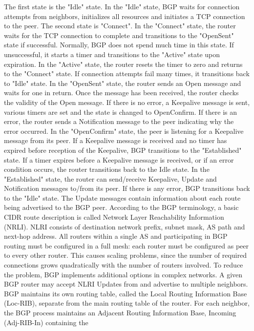 \documentclass[a4paper]{article}
\begin{document}
The first state is the "Idle" state. In the "Idle" state, BGP waits for connection attempts from neighbors, initializes
all resources and initiates a TCP connection to the peer. The second state is "Connect". In the "Connect" state, the
router waits for the TCP connection to complete and transitions to the "OpenSent" state if successful. Normally, BGP
does not spend much time in this state. If unsuccessful, it starts a timer and transitions to the "Active" state upon
expiration. In the "Active" state, the router resets the timer to zero and returns to the "Connect" state. If
connection attempts fail many times, it transitions back to "Idle" state. In the "OpenSent" state, the router sends an
Open message and waits for one in return. Once the message has been received, the router checks the validity of the
Open message. If there is no error, a Keepalive message is sent, various timers are set and the state is changed to
OpenConfirm. If there is an error, the router sends a Notification message to the peer indicating why the error
occurred. In the "OpenConfirm" state, the peer is listening for a Keepalive message from its peer. If a Keepalive
message is received and no timer has expired before reception of the Keepalive, BGP transitions to the "Established"
state. If a timer expires before a Keepalive message is received, or if an error condition occurs, the router
transitions back to the Idle state. In the "Established" state, the router can send/receive Keepalive, Update and
Notification messages to/from its peer. If there is any error, BGP transitions back to the "Idle" state. The Update
messages contain information about each route being advertised to the BGP peer. According to the BGP terminology, a
basic CIDR route description is called Network Layer Reachability Information (NRLI). NLRI consists of destination
network prefix, subnet mask, AS path and next-hop address.
All routers within a single AS and participating in BGP routing must be configured in a full mesh: each router must be
configured as peer to every other router. This causes scaling problems, since the number of required connections grows
quadratically with the number of routers involved. To reduce the problem, BGP implements additional options in complex
networks.
A given BGP router may accept NLRI Updates from and advertise to multiple neighbors. BGP maintains its own routing
table, called the Local Routing Information Base (Loc-RIB), separate from the main routing table of the router. For
each neighbor, the BGP process maintains an Adjacent Routing Information Base, Incoming (Adj-RIB-In) containing the
\end{document}
